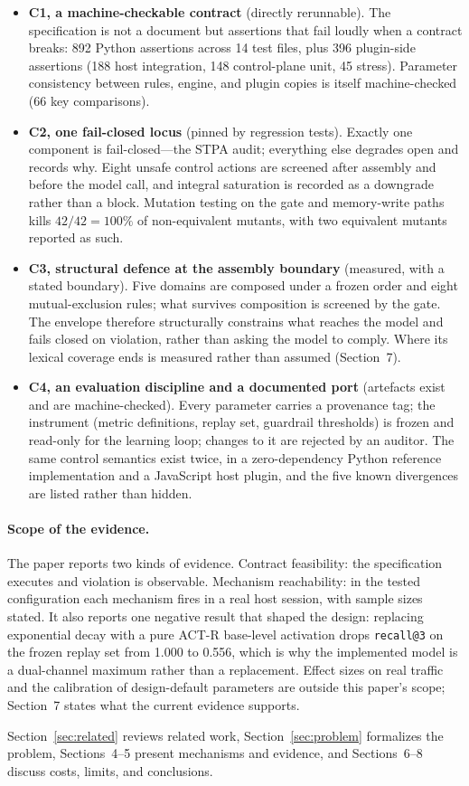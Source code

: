 \begin{itemize}
\item \textbf{C1, a machine-checkable contract} (directly rerunnable). The
specification is not a document but assertions that fail loudly when a contract
breaks: 892 Python assertions across 14 test files, plus 396 plugin-side
assertions (188 host integration, 148 control-plane unit, 45 stress). Parameter
consistency between rules, engine, and plugin copies is itself machine-checked
(66 key comparisons).
\item \textbf{C2, one fail-closed locus} (pinned by regression tests). Exactly
one component is fail-closed---the STPA audit; everything else degrades open and
records why. Eight unsafe control actions are screened after assembly and before
the model call, and integral saturation is recorded as a downgrade rather than a
block. Mutation testing on the gate and memory-write paths kills
$42/42=100\%$ of non-equivalent mutants, with two equivalent mutants reported as
such.
\item \textbf{C3, structural defence at the assembly boundary} (measured, with a
stated boundary). Five domains are composed under a frozen order and eight
mutual-exclusion rules; what survives composition is screened by the gate. The
envelope therefore structurally constrains what reaches the model and fails
closed on violation, rather than asking the model to comply. Where its lexical
coverage ends is measured rather than assumed (Section~7).
\item \textbf{C4, an evaluation discipline and a documented port} (artefacts
exist and are machine-checked). Every parameter carries a provenance tag; the
instrument (metric definitions, replay set, guardrail thresholds) is frozen and
read-only for the learning loop; changes to it are rejected by an auditor. The
same control semantics exist twice, in a zero-dependency Python reference
implementation and a JavaScript host plugin, and the five known divergences are
listed rather than hidden.
\end{itemize}

\paragraph{Scope of the evidence.} The paper reports two kinds of evidence.
Contract feasibility: the specification executes and violation is observable.
Mechanism reachability: in the tested configuration each mechanism fires in a
real host session, with sample sizes stated. It also reports one negative result
that shaped the design: replacing exponential decay with a pure ACT-R base-level
activation drops \texttt{recall@3} on the frozen replay set from 1.000 to 0.556,
which is why the implemented model is a dual-channel maximum rather than a
replacement. Effect sizes on real traffic and the calibration of design-default
parameters are outside this paper's scope; Section~7 states what the current
evidence supports.

Section~\ref{sec:related} reviews related work, Section~\ref{sec:problem}
formalizes the problem, Sections~4--5 present mechanisms and evidence, and
Sections~6--8 discuss costs, limits, and conclusions.

